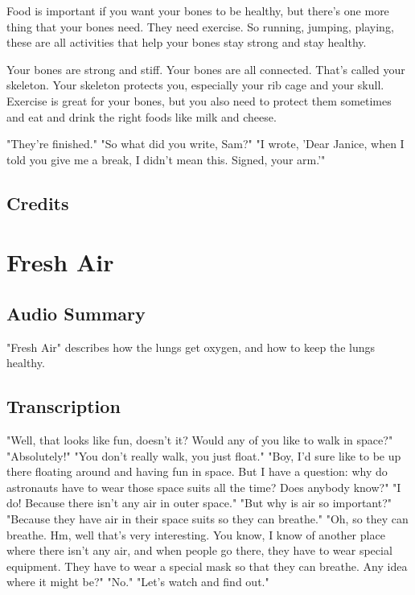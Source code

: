 Food is important if you want your bones to be healthy, but there's one more thing that your bones need. They need exercise. So running, jumping, playing, these are all activities that help your bones stay strong and stay healthy.

Your bones are strong and stiff. Your bones are all connected. That's called your skeleton. Your skeleton protects you, especially your rib cage and your skull. Exercise is great for your bones, but you also need to protect them sometimes and eat and drink the right foods like milk and cheese.

"They're finished." "So what did you write, Sam?" "I wrote, 'Dear Janice, when I told you give me a break, I didn't mean this. Signed, your arm.'"

\subsection{Credits}

\section{Fresh Air}

\subsection{Audio Summary}

"Fresh Air" describes how the lungs get oxygen, and how to keep the lungs healthy.

\subsection{Transcription}

"Well, that looks like fun, doesn't it? Would any of you like to walk in space?"
"Absolutely!"
"You don't really walk, you just float."
"Boy, I'd sure like to be up there floating around and having fun in space. But I have a question: why do astronauts have to wear those space suits all the time? Does anybody know?"
"I do! Because there isn't any air in outer space."
"But why is air so important?"
"Because they have air in their space suits so they can breathe."
"Oh, so they can breathe. Hm, well that's very interesting. You know, I know of another place where there isn't any air, and when people go there, they have to wear special equipment. They have to wear a special mask so that they can breathe. Any idea where it might be?"
"No."
"Let's watch and find out."

